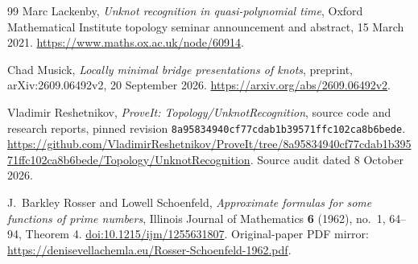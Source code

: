\begin{thebibliography}{99}
Marc Lackenby,
\emph{Unknot recognition in quasi-polynomial time},
Oxford Mathematical Institute topology seminar announcement and abstract,
15 March 2021.
\url{https://www.maths.ox.ac.uk/node/60914}.

Chad Musick,
\emph{Locally minimal bridge presentations of knots},
preprint, arXiv:2609.06492v2, 20 September 2026.
\url{https://arxiv.org/abs/2609.06492v2}.

Vladimir Reshetnikov,
\emph{ProveIt: Topology/UnknotRecognition},
source code and research reports, pinned revision
\texttt{8a95834940cf77cdab1b39571ffc102ca8b6bede}.
\url{https://github.com/VladimirReshetnikov/ProveIt/tree/8a95834940cf77cdab1b39571ffc102ca8b6bede/Topology/UnknotRecognition}.
Source audit dated 8 October 2026.

J.~Barkley Rosser and Lowell Schoenfeld,
\emph{Approximate formulas for some functions of prime numbers},
Illinois Journal of Mathematics \textbf{6} (1962), no.~1, 64--94, Theorem 4.
\href{https://doi.org/10.1215/ijm/1255631807}{doi:10.1215/ijm/1255631807}.
Original-paper PDF mirror:
\url{https://denisevellachemla.eu/Rosser-Schoenfeld-1962.pdf}.

\end{thebibliography}
